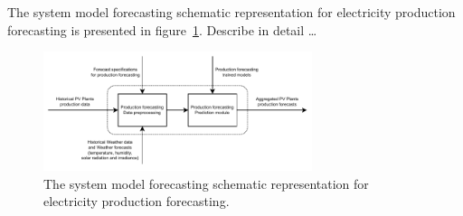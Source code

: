 The system model forecasting schematic representation for electricity production forecasting is presented in figure~\ref{fig:modelforecastingproduction}.
Describe in detail …

\begin{figure}[H]
\centering
\includegraphics[width=0.7\textwidth]{images/system_model_forecasting_production}
\caption{The system model forecasting schematic representation for electricity production forecasting.}
\label{fig:modelforecastingproduction}
\end{figure}
